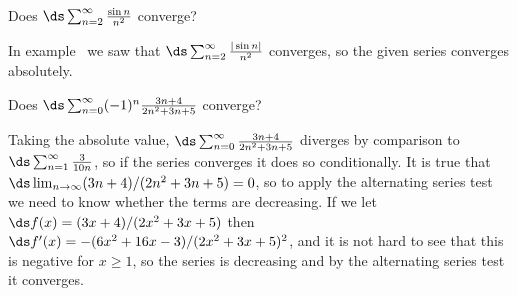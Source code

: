 \begin{example} Does $\ds\sum_{n=2}^\infty {\sin n\over n^2}$ converge?

\ssk\noindent
In example~ we saw that 
$\ds\sum_{n=2}^\infty {|\sin n|\over n^2}$ converges, so the given
series converges absolutely.
\end{example}

\begin{example} Does $\ds\sum_{n=0}^\infty (-1)^{n}{3n+4\over 2n^2+3n+5}$ converge?

\ssk\noindent
Taking the absolute value, $\ds\sum_{n=0}^\infty {3n+4\over 2n^2+3n+5}$
diverges by comparison to $\ds\sum_{n=1}^\infty {3\over 10n}$, so if
the series converges it does so conditionally. It is true that
$\ds\lim_{n\to\infty}(3n+4)/(2n^2+3n+5)=0$, so to apply the
alternating series test we need to know whether the terms are
decreasing.
If we let $\ds f(x)=(3x+4)/(2x^2+3x+5)$ then 
$\ds f'(x)=-(6x^2+16x-3)/(2x^2+3x+5)^2$, and it is not hard to see that
this is negative for $x\ge1$, so the series is decreasing and by the
alternating series test it converges.
\end{example}

